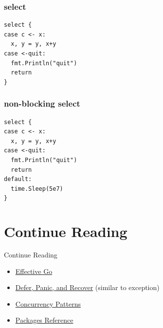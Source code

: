 \documentclass[xetex,mathserif,serif,12pt]{beamer}
\begin{document}
\begin{frame}[fragile]
  \frametitle{\ttfamily select}

  \begin{beamer@nomargin}
    \begin{lstlisting}
select {
case c <- x:
  x, y = y, x+y
case <-quit:
  fmt.Println("quit")
  return
}
    \end{lstlisting}
  \end{beamer@nomargin}
\end{frame}

\begin{frame}[fragile]
  \frametitle{non-blocking {\ttfamily select}}

  \begin{beamer@nomargin}
    \begin{lstlisting}
select {
case c <- x:
  x, y = y, x+y
case <-quit:
  fmt.Println("quit")
  return
default:
  time.Sleep(5e7)
}
    \end{lstlisting}
  \end{beamer@nomargin}
\end{frame}

\section{Continue Reading}

\begin{frame}{Continue Reading}
  \begin{itemize}
  \item \href{http://golang.org/doc/effective_go.html}{Effective Go}
  \item \href{http://golang.org/doc/articles/defer_panic_recover.html}{Defer,
      Panic, and Recover} (similar to exception)
  \item
    \href{http://golang.org/doc/articles/concurrency_patterns.html}{Concurrency
      Patterns}
  \item \href{http://golang.org/pkg/}{Packages Reference}
\end{itemize}
\end{frame}
\end{document}
